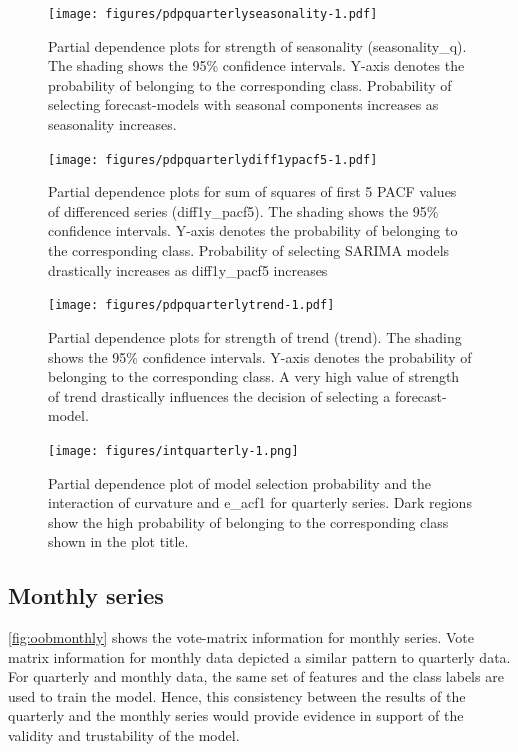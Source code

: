 \documentclass[11pt,a4paper,]{article}
\begin{document}
\begin{figure}
\centering
\texttt{[image: figures/pdpquarterlyseasonality-1.pdf]}
\caption{\label{fig:pdpquarterlyseasonality}Partial dependence plots for strength of seasonality (seasonality\_q). The shading shows the 95\% confidence intervals. Y-axis denotes the probability of belonging to the corresponding class. Probability of selecting forecast-models with seasonal components increases as seasonality increases.}
\end{figure}

\begin{figure}
\centering
\texttt{[image: figures/pdpquarterlydiff1ypacf5-1.pdf]}
\caption{\label{fig:pdpquarterlydiff1ypacf5}Partial dependence plots for sum of squares of first 5 PACF values of differenced series (diff1y\_pacf5). The shading shows the 95\% confidence intervals. Y-axis denotes the probability of belonging to the corresponding class. Probability of selecting SARIMA models drastically increases as diff1y\_pacf5 increases}
\end{figure}

\begin{figure}
\centering
\texttt{[image: figures/pdpquarterlytrend-1.pdf]}
\caption{\label{fig:pdpquarterlytrend}Partial dependence plots for strength of trend (trend). The shading shows the 95\% confidence intervals. Y-axis denotes the probability of belonging to the corresponding class. A very high value of strength of trend drastically influences the decision of selecting a forecast-model.}
\end{figure}

\begin{figure}
\centering
\texttt{[image: figures/intquarterly-1.png]}
\caption{\label{fig:intquarterly}Partial dependence plot of model selection probability and the interaction of curvature and e\_acf1 for quarterly series. Dark regions show the high probability of belonging to the corresponding class shown in the plot title.}
\end{figure}

\hypertarget{monthly-series}{%
\subsection{Monthly series}\label{monthly-series}}

\autoref{fig:oobmonthly} shows the vote-matrix information for monthly series. Vote matrix information for monthly data depicted a similar pattern to quarterly data. For quarterly and monthly data, the same set of features and the class labels are used to train the model. Hence, this consistency between the results of the quarterly and the monthly series would provide evidence in support of the validity and trustability of the model.
\end{document}
